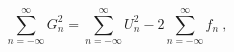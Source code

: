 \begin{equation}
  \label{eq:loopG}
  \sum_{n=-\infty}^{\infty} G_n^2=\sum_{n=-\infty}^{\infty} U_n^2 - 
2\sum_{n=-\infty}^{\infty} f_n \ ,
\end{equation}

